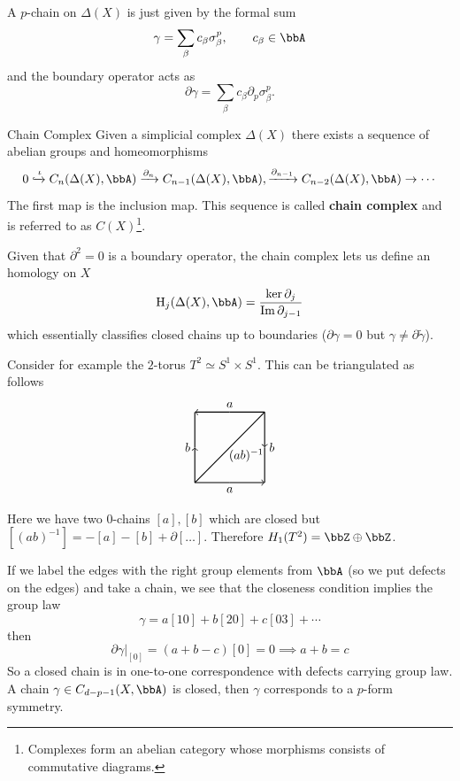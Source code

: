 \documentclass[11pt]{article}
\theoremstyle{definition}
\numberwithin{equation}{section}
\newcommand\HH{\mathrm{H}}
\begin{document}
A $p$-chain on $\Delta(X)$ is just given by the formal sum
\begin{equation}
	 \gamma=\sum_{\beta}c_{\beta}\sigma^{p}_{\beta},\qquad c_{\beta}\in\bbA
\end{equation}
and the boundary operator acts as
\begin{equation}
	\partial \gamma=\sum_{\beta}c_{\beta}\partial_{p}\sigma_{\beta}^{p}.
\end{equation}
\begin{defn}{Chain Complex}{}
	Given a simplicial complex $\Delta(X)$ there exists a sequence of abelian groups and homeomorphisms
	\begin{equation}
		0\xhookrightarrow{\iota} C_{n}(\Delta(X),\bbA)\xrightarrow{\partial_{n}} C_{n-1}(\Delta(X),\bbA),\xrightarrow{\partial_{n-1}}C_{n-2}(\Delta(X),\bbA)\rightarrow\cdots
	\end{equation}
	The first map is the inclusion map. This sequence is called \textbf{chain complex} and is referred to as $C(X)$\footnote{Complexes form an abelian category whose morphisms consists of commutative diagrams.}.
\end{defn}
Given that $\partial^{2}=0$ is a boundary operator, the chain complex lets us define an homology on $X$
\begin{equation}
	\HH_{j}(\Delta(X),\bbA)=\frac{\ker \partial_{j}}{\Im \partial_{j-1}}
\end{equation}
which essentially classifies closed chains up to boundaries ($\partial\gamma=0$ but $\gamma\neq\partial\tilde\gamma$).

Consider for example the $2$-torus $T^{2}\simeq S^{1}\times S^{1}$. This can be triangulated as follows
\begin{equation}
\begin{tikzpicture}[thick]
  \draw[->](0,0)--(0,1) node[anchor=east] {$b$};
  \draw[-](0,1)--(0,2);
  \draw[<-](0,2)--(1,2) node[anchor=south] {$a$};
  \draw[-](1,2)--(2,2);
  \draw[->](2,2)--(2,1)node[anchor=west] {$b$};
  \draw[-](2,1)--(2,0);
  \draw[<-](2,0)--(1,0) node[anchor=north] {$a$};
  \draw[-](1,0)--(0,0);
  \draw[-](0,0)--(2,2) node[yshift=-35, xshift=-15] {$\tiny (ab)^{-1}$};
\end{tikzpicture}
\end{equation}
Here we have two $0$-chains $[a],[b]$ which are closed but $[(ab)^{-1}]=-[a]-[b]+\partial[\ldots]$. Therefore $H_{1}(T^{2})=\bbZ\oplus\bbZ$.

If we label the edges with the right group elements from $\bbA$ (so we put defects on the edges) and take a chain, we see that the closeness condition implies the group law
\begin{equation}
	\gamma=a[10]+b[20]+c[03]+\cdots
\end{equation}
then
\begin{equation}
	\left.\partial\gamma\right|_{[0]}=(a+b-c)[0]=0\implies a+b=c
\end{equation}
So a closed chain is in one-to-one correspondence with defects carrying group law. A chain $\gamma\in C_{d-p-1}(X,\bbA)$ is closed, then $\gamma$ corresponds to a $p$-form symmetry.
\end{document}
